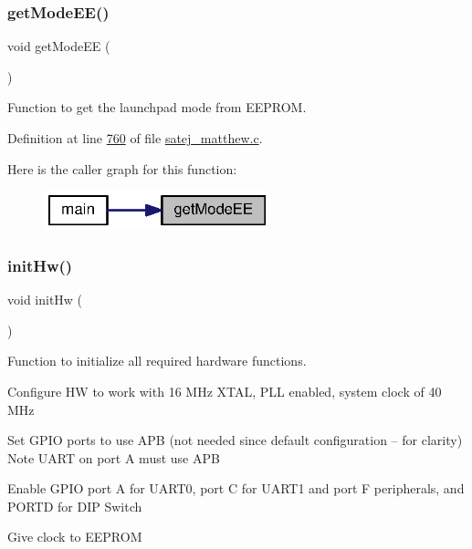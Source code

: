 \subsubsection{\texorpdfstring{getModeEE()}{getModeEE()}}
{\footnotesize\ttfamily void get\+Mode\+EE (\begin{DoxyParamCaption}{ }\end{DoxyParamCaption})}



Function to get the launchpad mode from E\+E\+P\+R\+OM. 



Definition at line \mbox{\hyperlink{satej__matthew_8c_source_l00760}{760}} of file \mbox{\hyperlink{satej__matthew_8c_source}{satej\+\_\+matthew.\+c}}.

Here is the caller graph for this function\+:\nopagebreak
\begin{figure}[H]
\begin{center}
\leavevmode
\includegraphics[width=186pt]{satej__matthew_8c_a19138fc0f5846980204bb7be7e119d56_icgraph}
\end{center}
\end{figure}
\mbox{\label{satej__matthew_8c_ae5e20c90f0611c1fd09fad99cc3a30a6}} 
\subsubsection{\texorpdfstring{initHw()}{initHw()}}
{\footnotesize\ttfamily void init\+Hw (\begin{DoxyParamCaption}{ }\end{DoxyParamCaption})}



Function to initialize all required hardware functions. 

Configure HW to work with 16 M\+Hz X\+T\+AL, P\+LL enabled, system clock of 40 M\+Hz

Set G\+P\+IO ports to use A\+PB (not needed since default configuration -- for clarity) Note U\+A\+RT on port A must use A\+PB

Enable G\+P\+IO port A for U\+A\+R\+T0, port C for U\+A\+R\+T1 and port F peripherals, and P\+O\+R\+TD for D\+IP Switch

Give clock to E\+E\+P\+R\+OM

